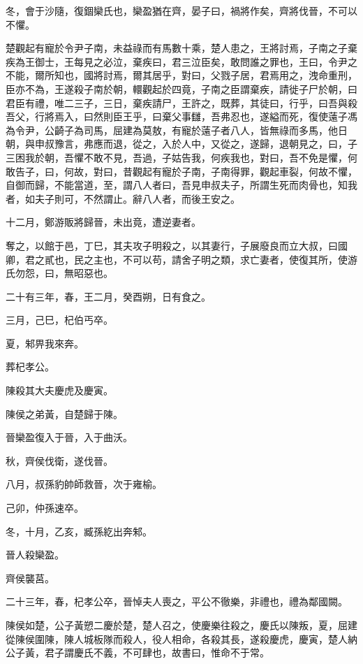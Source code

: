 \begin{pinyinscope}
冬，會于沙隨，復錮欒氏也，欒盈猶在齊，晏子曰，禍將作矣，齊將伐晉，不可以不懼。

楚觀起有寵於令尹子南，未益祿而有馬數十乘，楚人患之，王將討焉，子南之子棄疾為王御士，王每見之必泣，棄疾曰，君三泣臣矣，敢問誰之罪也，王曰，令尹之不能，爾所知也，國將討焉，爾其居乎，對曰，父戮子居，君焉用之，洩命重刑，臣亦不為，王遂殺子南於朝，轘觀起於四竟，子南之臣謂棄疾，請徙子尸於朝，曰君臣有禮，唯二三子，三日，棄疾請尸，王許之，既葬，其徒曰，行乎，曰吾與殺吾父，行將焉入，曰然則臣王乎，曰棄父事讎，吾弗忍也，遂縊而死，復使薳子馮為令尹，公齮子為司馬，屈建為莫敖，有寵於薳子者八人，皆無祿而多馬，他日朝，與申叔豫言，弗應而退，從之，入於人中，又從之，遂歸，退朝見之，曰，子三困我於朝，吾懼不敢不見，吾過，子姑告我，何疾我也，對曰，吾不免是懼，何敢告子，曰，何故，對曰，昔觀起有寵於子南，子南得罪，觀起車裂，何故不懼，自御而歸，不能當道，至，謂八人者曰，吾見申叔夫子，所謂生死而肉骨也，知我者，如夫子則可，不然謂止。辭八人者，而後王安之。

十二月，鄭游販將歸晉，未出竟，遭逆妻者。

奪之，以館于邑，丁巳，其夫攻子明殺之，以其妻行，子展廢良而立大叔，曰國卿，君之貳也，民之主也，不可以苟，請舍子明之類，求亡妻者，使復其所，使游氏勿怨，曰，無昭惡也。

二十有三年，春，王二月，癸酉朔，日有食之。

三月，己巳，杞伯丐卒。

夏，邾畀我來奔。

葬杞孝公。

陳殺其大夫慶虎及慶寅。

陳侯之弟黃，自楚歸于陳。

晉欒盈復入于晉，入于曲沃。

秋，齊侯伐衛，遂伐晉。

八月，叔孫豹帥師救晉，次于雍榆。

己卯，仲孫速卒。

冬，十月，乙亥，臧孫紇出奔邾。

晉人殺欒盈。

齊侯襲莒。

二十三年，春，杞孝公卒，晉悼夫人喪之，平公不徹樂，非禮也，禮為鄰國闕。

陳侯如楚，公子黃愬二慶於楚，楚人召之，使慶樂往殺之，慶氏以陳叛，夏，屈建從陳侯圍陳，陳人城板隊而殺人，役人相命，各殺其長，遂殺慶虎，慶寅，楚人納公子黃，君子謂慶氏不義，不可肆也，故書曰，惟命不于常。


\end{pinyinscope}
